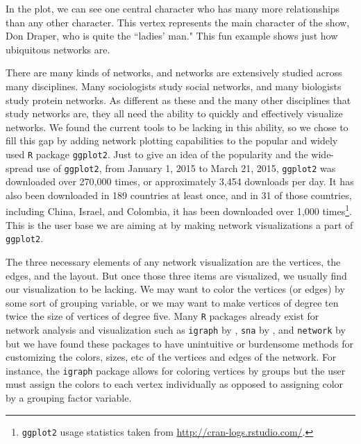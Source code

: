 \documentclass[11pt]{article}\usepackage[]{graphicx}\usepackage[]{color}
\begin{document}
 In the plot, we can see one central character who has many more relationships than any other character. This vertex represents the main character of the show, Don Draper, who is quite the ``ladies' man."  This fun example shows just how ubiquitous networks are.
\par There are many kinds of networks, and networks are extensively studied across many disciplines.  Many sociologists study social networks, and many biologists study protein networks. As different as these and the many other disciplines that study networks are, they all need the ability to quickly and effectively visualize networks.  We found the current tools to be lacking in this ability, so we chose to fill this gap by adding network plotting capabilities to the popular and widely used \texttt{R} package \texttt{ggplot2}. Just to give an idea of the popularity and the wide-spread use of \texttt{ggplot2}, from January 1, 2015 to March 21, 2015, \texttt{ggplot2} was downloaded over 270,000 times, or approximately 3,454 downloads per day. It has also been downloaded in 189 countries at least once, and in 31 of those countries, including China, Israel, and Colombia, it has been downloaded over 1,000 times\footnote{\texttt{ggplot2} usage statistics taken from \url{http://cran-logs.rstudio.com/}.}. This is the user base we are aiming at by making network visualizations a part of \texttt{ggplot2}.

\par The three necessary elements of any network visualization are the vertices, the edges, and the layout.  But once those three items are visualized, we usually find our visualization to be lacking.  We may want to color the vertices (or edges) by some sort of grouping variable, or we may want to make vertices of degree ten twice the size of vertices of degree five.  Many \texttt{R} packages already exist for network analysis and visualization such as \texttt{igraph} by \citet{igraph}, \texttt{sna} by \citet{sna}, and \texttt{network} by \citet{network.jss, network} but we have found these packages to have unintuitive or burdensome methods for customizing the colors, sizes, etc of the vertices and edges of the network. For instance, the \texttt{igraph} package allows for coloring vertices by groups but the user must assign the colors to each vertex individually as opposed to assigning color by a grouping factor variable. \\
\end{document}
